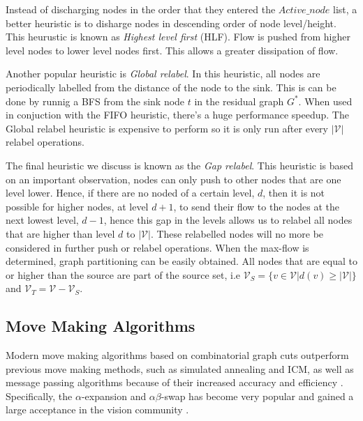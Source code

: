 Instead of discharging nodes in the order that they entered the $Active\_node$ list, a better heuristic is to disharge nodes in descending order of node level/height. This heurustic is known as \textit{Highest level first} (HLF). Flow is pushed from higher level nodes to lower level nodes first. This allows a greater dissipation of flow.

Another popular heuristic is \textit{Global relabel}. In this heuristic, all nodes are periodically labelled from the distance of the node to the sink. This is can be done by runnig a BFS from the sink node $t$ in the residual graph $G^*$. When used in conjuction with the FIFO heuristic, there's a huge performance speedup. The Global relabel heuristic is expensive to perform so it is only run after every $|\mathcal{V}|$ relabel operations. 

The final heuristic we discuss is known as the \textit{Gap relabel}. This heuristic is based on an important observation, nodes can only push to other nodes that are one level lower. Hence, if there are no noded of a certain level, $d$, then it is not possible for higher nodes, at level $d+1$, to send their flow to the nodes at the next lowest level, $d-1$, hence this gap in the levels allows us to relabel all nodes that are higher than level $d$ to $|\mathcal{V}|$. These relabelled nodes will no more be considered in further \textsf{push} or \textsf{relabel} operations. When the max-flow is determined, graph partitioning can be easily obtained. All nodes that are equal to or higher than the source are part of the source set, i.e $\mathcal{V}_S=\{v \in \mathcal{V} | d(v)\geq |\mathcal{V}|\}$ and $\mathcal{V}_T = \mathcal{V}-\mathcal{V}_S$.
%


\subsection{Move Making Algorithms}
\label{sec:movemaking}

Modern move making algorithms based on combinatorial graph cuts outperform previous move making methods, such as simulated annealing and ICM, as well as message passing algorithms because of their increased accuracy and efficiency \cite{Szeliski2008}. Specifically, the $\alpha$-expansion and $\alpha\beta$-swap \cite{Boykov2001} has become very popular and gained a large acceptance in the vision community \citep{Vu2008_2}.

